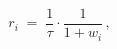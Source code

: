 \documentclass{article}
\begin{document}
\begin{equation}\label{eq:dilation}
  r_i \;=\; \frac{1}{\tau}\cdot\frac{1}{1 + w_i}\,,
\end{equation}
\end{document}

